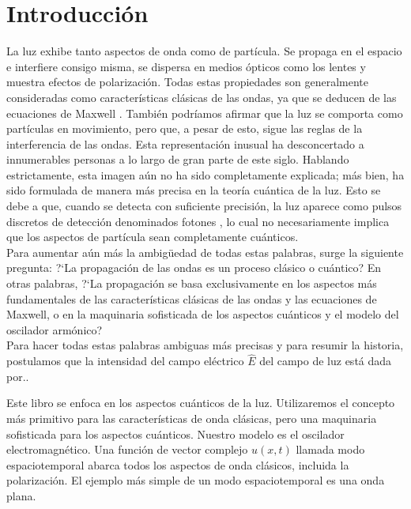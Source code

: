 



\chapter{Introducci\'on}


La luz exhibe tanto aspectos de onda como de partícula. Se propaga en el espacio e interfiere consigo misma, se dispersa en medios ópticos como los lentes y muestra efectos de polarización. Todas estas propiedades son generalmente consideradas como características clásicas de las ondas, ya que se deducen de las ecuaciones de Maxwell \cite{purcell2011electricity,Jackson:100964}. También podríamos afirmar que la luz se comporta como partículas en movimiento, pero que, a pesar de esto, sigue las reglas de la interferencia de las ondas. Esta representación inusual ha desconcertado a innumerables personas a lo largo de gran parte de este siglo. Hablando estrictamente, esta imagen aún no ha sido completamente explicada; más bien, ha sido formulada de manera más precisa en la teoría cuántica de la luz. Esto se debe a que, cuando se detecta con suficiente precisión, la luz aparece como pulsos discretos de detección denominados fotones \cite{Leonhardt,Bachor}, lo cual no necesariamente implica que los aspectos de partícula sean completamente cuánticos.\\


Para aumentar aún más la ambigüedad de todas estas palabras, surge la siguiente pregunta: ?`La propagación de las ondas es un proceso clásico o cuántico? En otras palabras, ?`La propagaci\'on se basa exclusivamente en los aspectos más fundamentales de las características clásicas de las ondas y las ecuaciones de Maxwell, o en la maquinaria sofisticada de los aspectos cuánticos y el modelo del oscilador armónico?\\









Para hacer todas estas palabras ambiguas más precisas y para resumir la historia, postulamos que la intensidad del campo eléctrico $\hat{E}$ del campo de luz está dada por..



 Este libro se enfoca en los aspectos cuánticos de la luz. Utilizaremos el concepto más primitivo para las características de onda clásicas, pero una maquinaria sofisticada para los aspectos cuánticos. Nuestro modelo es el oscilador electromagnético. Una función de vector complejo $u(x,t)$ llamada modo espaciotemporal abarca todos los aspectos de onda clásicos, incluida la polarización. El ejemplo más simple de un modo espaciotemporal es una onda plana.















